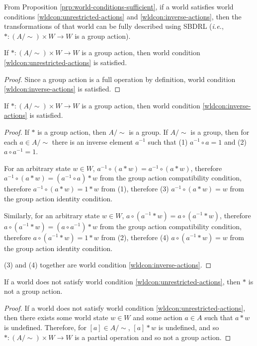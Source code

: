 	From Proposition \ref{prp:world-conditions-sufficient}, if a world satisfies world conditions \ref{wldcon:unrestricted-actions} and \ref{wldcon:inverse-actions}, then the transformations of that world can be fully described using SBDRL (\textit{i.e.}, $*: (A/\sim) \times W \to W$ is a group action).

	\begin{proposition}\label{prp:unrestricted-actions-necessary}
		If $*: (A/\sim) \times W \to W$ is a group action, then world condition \ref{wldcon:unrestricted-actions} is satisfied.
	\end{proposition}
	\begin{proof}
		Since a group action is a full operation by definition,  world condition \ref{wldcon:inverse-actions} is satisfied.
	\end{proof}

	\begin{proposition}\label{prp:inverse-actions-sufficient}
		If $*: (A/\sim) \times W \to W$ is a group action, then world condition \ref{wldcon:inverse-actions} is satisfied.
	\end{proposition}
	\begin{proof}
		If $*$ is a group action,
		then $A/\sim$ is a group.
		If $A/\sim$ is a group, then for each $a \in A/\sim$ there is an inverse element $a^{-1}$ such that (1) $a^{-1} \circ a = 1$ and (2) $a \circ a^{-1} = 1$.

		For an arbitrary state $w \in W$, $a^{-1} \circ (a * w) = a^{-1} \circ (a * w)$, therefore $a^{-1} \circ (a * w) = (a^{-1} \circ a) * w$ from the group action compatibility condition, therefore  $a^{-1} \circ (a * w) = 1 * w$ from (1), therefore (3) $a^{-1} \circ (a * w) = w$ from the group action identity condition.

		Similarly, for an arbitrary state $w \in W$, $a \circ (a^{-1} * w) = a \circ (a^{-1} * w)$, therefore $a \circ (a^{-1} * w) = (a \circ a^{-1}) * w$ from the group action compatibility condition, therefore $a \circ (a^{-1} * w) = 1 * w$ from (2), therefore (4) $a \circ (a^{-1} * w) = w$ from the group action identity condition.

		(3) and (4) together are world condition \ref{wldcon:inverse-actions}.
	\end{proof}


	\begin{proposition}\label{prp:WC-unrestricted-actions-necessary}
		If a world does not satisfy world condition \ref{wldcon:unrestricted-actions}, then $*$ is not a group action.
	\end{proposition}
	\begin{proof}
		If a world does not satisfy world condition \ref{wldcon:unrestricted-actions}, then there exists some world state $w \in W$ and some action $a \in A$ such that $a * w$ is undefined.
		Therefore, for $[a] \in A/\sim$, $[a] * w$ is undefined, and so $*: (A/\sim) \times W \to W$ is a partial operation and so not a group action.
	\end{proof}


